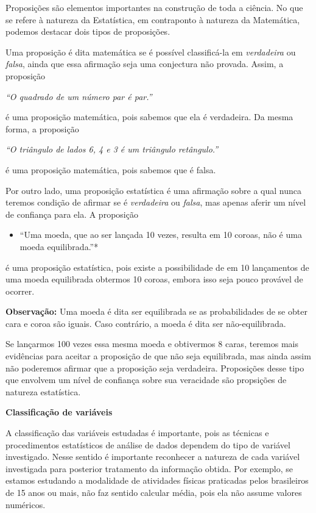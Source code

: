 \begin{reflection}
Proposições são elementos importantes na construção de toda a ciência. No que se refere à natureza da Estatística, em contraponto à natureza da Matemática, podemos destacar dois tipos de proposições.

Uma proposição é dita matemática se é possível classificá-la em \emph{verdadeira} ou \emph{falsa}, ainda que essa afirmação seja uma conjectura não provada. Assim, a proposição

\emph{``O quadrado de um número par é par.''}

é uma proposição matemática, pois sabemos que ela é verdadeira. Da mesma forma, a proposição

\emph{``O triângulo de lados 6, 4 e 3 é um triângulo retângulo.''}

é uma proposição matemática, pois sabemos que é falsa.

Por outro lado, uma proposição estatística é uma afirmação sobre a qual nunca teremos condição de afirmar se é \emph{verdadeira} ou \emph{falsa}, mas apenas aferir um nível de confiança para ela. A proposição
\begin{itemize}
\item {} 
``Uma moeda, que ao ser lançada 10 vezes, resulta em 10 coroas, não é uma moeda equilibrada.''*

\end{itemize}

é uma proposição estatística, pois existe a possibilidade de em 10 lançamentos de uma moeda equilibrada obtermos 10 coroas, embora isso seja pouco provável de ocorrer.

\textbf{Observação:} Uma moeda é dita ser equilibrada se as probabilidades de se obter cara e coroa são iguais. Caso contrário, a moeda é dita ser não-equilibrada.

Se lançarmos 100 vezes essa mesma moeda e obtivermos 8 caras, teremos mais evidências para aceitar a proposição de que não seja equilibrada, mas ainda assim não poderemos afirmar que a proposição seja verdadeira. Proposições desse tipo que envolvem um nível de confiança sobre sua veracidade são propsições de natureza estatística.
\end{reflection}
\label{\detokenize{PE103-1:sub-classificacao-de-variaveis}}
\textbf{Classificação de variáveis}

A classificação das variáveis estudadas é importante, pois as técnicas e procedimentos estatísticos de análise de dados dependem do tipo de variável investigado. Nesse sentido é importante reconhecer a natureza de cada variável investigada para posterior tratamento da informação obtida. Por exemplo, se estamos estudando a modalidade de atividades físicas praticadas pelos brasileiros de 15 anos ou mais, não faz sentido calcular média, pois  ela não assume valores numéricos.

